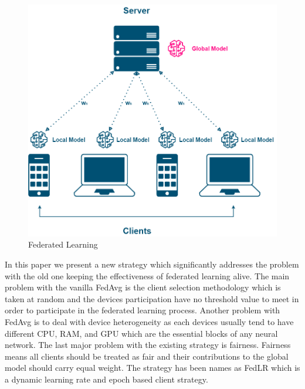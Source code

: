 \documentclass[conference]{IEEEtran}
\begin{document}
\begin{figure}[htp!]
	\centering
	\includegraphics[scale=.2]{Images/FEDLEARN_NEW}
	\caption{Federated Learning}
	\label{fig1}
\end{figure}

 In this paper we present a new strategy which significantly addresses the problem with the old one keeping the effectiveness of federated learning alive. The main problem with the vanilla FedAvg is the client selection methodology which is taken at random and the devices participation have no threshold value to meet in order to participate in the federated learning process. Another problem with FedAvg is to deal with device heterogeneity as each devices usually tend to have different CPU, RAM, and GPU which are the essential blocks of any neural network. The last major problem with the existing strategy is fairness. Fairness means all clients should be treated as fair and their contributions to the global model should carry equal weight. The strategy has been names as FedLR which is a dynamic learning rate and epoch based client strategy.
 
\end{document}
